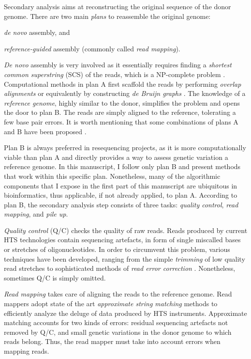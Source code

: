 Secondary analysis aims at reconstructing the original sequence of the donor genome.
There are two main \emph{plans} to reassemble the original genome: \begin{inparaenum}[(A)]
\item \emph{de novo} assembly, and
\item \emph{reference-guided} assembly (commonly called \emph{read mapping}).
\end{inparaenum}
\emph{De novo} assembly is very involved as it essentially requires finding a \emph{shortest common superstring} (SCS) of the reads, which is a NP-complete problem \citep{Maier1977,Gallant1980,Turner1989}.
Computational methods in plan A first scaffold the reads by performing \emph{overlap alignments} \citep{Myers2005} or equivalently by constructing \emph{de Bruijn graphs} \citep{Pevzner2001}.
The knowledge of a \emph{reference genome}, highly similar to the donor, simplifies the problem and opens the door to plan B.
The reads are simply aligned to the reference, tolerating a few base pair errors.
It is worth mentioning that some combinations of plans A and B have been proposed \citep{Li2012}.

Plan B is always preferred in resequencing projects, as it is more computationally viable than plan A and directly provides a way to assess genetic variation \wrt a reference genome.
In this manuscript, I follow only plan B and present methods that work within this specific plan.
Nonetheless, many of the algorithmic components that I expose in the first part of this manuscript are ubiquitous in bioinformatics, thus applicable, if not already applied, to plan A.
According to plan B, the secondary analysis step consists of three tasks: \emph{quality control}, \emph{read mapping}, and \emph{pile up}.

\emph{Quality control} (Q/C) checks the quality of raw reads.
Reads produced by current HTS technologies contain sequencing artefacts, in form of single miscalled bases or stretches of oligonucleotides.
In order to circumvent this problem, various techniques have been developed, ranging from the simple \emph{trimming} of low quality read stretches to sophisticated methods of \emph{read error correction} \citep{Weese2013a}.
Nonetheless, sometimes Q/C is simply omitted.

\emph{Read mapping} takes care of aligning the reads to the reference genome.
Read mappers adopt state of the art \emph{approximate string matching} methods to efficiently analyze the deluge of data produced by HTS instruments.
Approximate matching accounts for two kinds of errors:
residual sequencing artefacts not removed by Q/C, and small genetic variations in the donor genome to which reads belong.
Thus, the read mapper must take into account errors when mapping reads.

